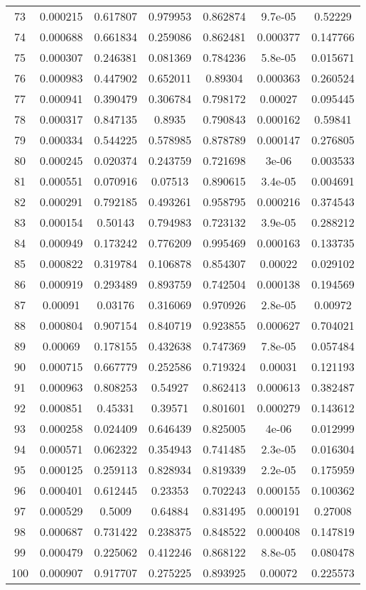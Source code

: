 \begin{table}
\begin{tabular}{c|c|c|c|c|c|c}
73 & 0.000215 & 0.617807 & 0.979953 & 0.862874 & 9.7e-05 & 0.52229\\
74 & 0.000688 & 0.661834 & 0.259086 & 0.862481 & 0.000377 & 0.147766\\
75 & 0.000307 & 0.246381 & 0.081369 & 0.784236 & 5.8e-05 & 0.015671\\
76 & 0.000983 & 0.447902 & 0.652011 & 0.89304 & 0.000363 & 0.260524\\
77 & 0.000941 & 0.390479 & 0.306784 & 0.798172 & 0.00027 & 0.095445\\
78 & 0.000317 & 0.847135 & 0.8935 & 0.790843 & 0.000162 & 0.59841\\
79 & 0.000334 & 0.544225 & 0.578985 & 0.878789 & 0.000147 & 0.276805\\
80 & 0.000245 & 0.020374 & 0.243759 & 0.721698 & 3e-06 & 0.003533\\
81 & 0.000551 & 0.070916 & 0.07513 & 0.890615 & 3.4e-05 & 0.004691\\
82 & 0.000291 & 0.792185 & 0.493261 & 0.958795 & 0.000216 & 0.374543\\
83 & 0.000154 & 0.50143 & 0.794983 & 0.723132 & 3.9e-05 & 0.288212\\
84 & 0.000949 & 0.173242 & 0.776209 & 0.995469 & 0.000163 & 0.133735\\
85 & 0.000822 & 0.319784 & 0.106878 & 0.854307 & 0.00022 & 0.029102\\
86 & 0.000919 & 0.293489 & 0.893759 & 0.742504 & 0.000138 & 0.194569\\
87 & 0.00091 & 0.03176 & 0.316069 & 0.970926 & 2.8e-05 & 0.00972\\
88 & 0.000804 & 0.907154 & 0.840719 & 0.923855 & 0.000627 & 0.704021\\
89 & 0.00069 & 0.178155 & 0.432638 & 0.747369 & 7.8e-05 & 0.057484\\
90 & 0.000715 & 0.667779 & 0.252586 & 0.719324 & 0.00031 & 0.121193\\
91 & 0.000963 & 0.808253 & 0.54927 & 0.862413 & 0.000613 & 0.382487\\
92 & 0.000851 & 0.45331 & 0.39571 & 0.801601 & 0.000279 & 0.143612\\
93 & 0.000258 & 0.024409 & 0.646439 & 0.825005 & 4e-06 & 0.012999\\
94 & 0.000571 & 0.062322 & 0.354943 & 0.741485 & 2.3e-05 & 0.016304\\
95 & 0.000125 & 0.259113 & 0.828934 & 0.819339 & 2.2e-05 & 0.175959\\
96 & 0.000401 & 0.612445 & 0.23353 & 0.702243 & 0.000155 & 0.100362\\
97 & 0.000529 & 0.5009 & 0.64884 & 0.831495 & 0.000191 & 0.27008\\
98 & 0.000687 & 0.731422 & 0.238375 & 0.848522 & 0.000408 & 0.147819\\
99 & 0.000479 & 0.225062 & 0.412246 & 0.868122 & 8.8e-05 & 0.080478\\
100 & 0.000907 & 0.917707 & 0.275225 & 0.893925 & 0.00072 & 0.225573\\
\end{tabular}
\end{table}
